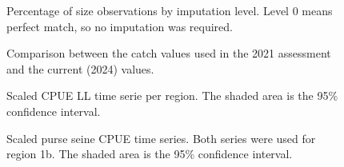 \documentclass[
]{scrartcl}
\begin{document}
\newpage{}

\begin{figure}


\caption{\label{fig-imputation}Percentage of size observations by
imputation level. Level 0 means perfect match, so no imputation was
required.}

\end{figure}%

\newpage{}

\begin{figure}


\caption{\label{fig-comp-catch}Comparison between the catch values used
in the 2021 assessment and the current (2024) values.}

\end{figure}%

\newpage{}

\begin{figure}


\caption{\label{fig-ts-cpue}Scaled CPUE LL time serie per region. The
shaded area is the 95\% confidence interval.}

\end{figure}%

\newpage{}

\begin{figure}


\caption{\label{fig-ts-ps-cpue}Scaled purse seine CPUE time series. Both
series were used for region 1b. The shaded area is the 95\% confidence
interval.}

\end{figure}%
\end{document}
